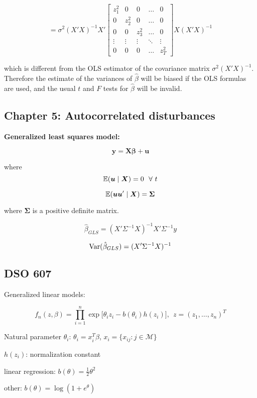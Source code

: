\[
= \sigma^2(X'X)^{-1}X' \begin{bmatrix}
    z_1^2 &0 & 0 & \dots & 0 \\
   0 & z_2^2 &0 & \dots  & 0 \\
   0 & 0 &  z_3^2 & \dots  & 0 \\
    \vdots & \vdots & \vdots & \ddots & \vdots \\
    0 & 0 &0 & \dots  &  z_T^2
\end{bmatrix}  X(X'X)^{-1}
\]

which is different from the OLS estimator of the covariance matrix \(\sigma^2(X'X)^{-1}\). Therefore the estimate of the variances of \(\hat{\beta}\) will be biased if the OLS formulas are used, and the usual \(t\) and \(F\) tests for \(\hat{\beta}\) will be invalid.

\subsection{Chapter 5: Autocorrelated disturbances}

\textbf{Generalized least squares model:}

\[
\boldsymbol{y} = \boldsymbol{X}\boldsymbol{\beta} + \boldsymbol{u}
\]

where
\[
\E(\boldsymbol{u} \mid \boldsymbol{X}) = 0 \ \ \forall \ t
\]

\[
\E(\boldsymbol{u} \boldsymbol{u}' \mid \boldsymbol{X}) = \boldsymbol{\Sigma} 
\]

where \(\boldsymbol{\Sigma}\) is a positive definite matrix.

\[
\hat{\beta}_{GLS} = (X' \Sigma^{-1}X)^{-1}X' \Sigma^{-1}y 
\]

\[
\Var(\hat{\beta}_{GLS}) = (X' \Sigma^{-1} X)^{-1}
\]

\subsection{DSO 607}

Generalized linear models:

\[
f_n(z, \beta) = \prod_{i=1}^n \exp \big[ \theta_i z_i - b(\theta_i) h(z_i) \big], \ \ z = (z_1, \ldots, z_n)^T
\]

Natural parameter \(\theta_i\): \(\theta_i = x_i^T \beta\), \(x_i = \{x_{ij}: j \in \mathscr{M} \}\)

\(h(z_i)\): normalization constant

linear regression: \(b(\theta) = \frac{1}{2} \theta^2\)

other: \(b(\theta) = \log(1 + e^{\theta})\)

